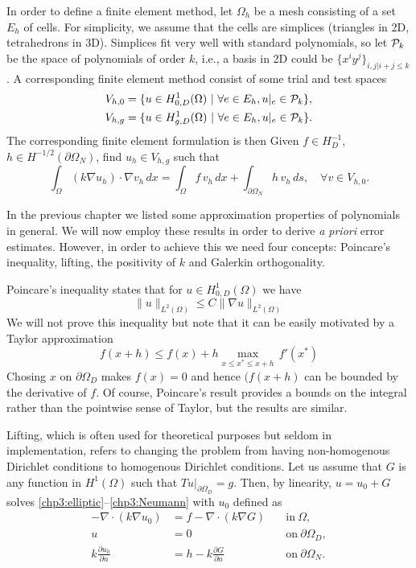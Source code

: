 In order to define a finite element method, let $\Omega_h$ be a mesh consisting of a set $E_h$ of cells. 
For simplicity, we assume that the cells are simplices (triangles in 2D, tetrahedrons in 3D). Simplices 
fit very well with standard polynomials, so let ${\cal P}_k$ be the space of 
polynomials of order $k$, i.e., a basis in 2D could be $\{x^i y^{j} \}_{i,j | i+j \le k}$.   
A corresponding finite element method consist of some trial and test spaces 
\begin{align}
V_{h, 0}  &= \{ u \in H^1_{0,D}(\Omega) \ | \  \forall e \in E_h, u|_e \in {\cal P}_k \}, \\   
V_{h, g}  &= \{ u \in H^1_{g,D}(\Omega) \ | \  \forall e \in E_h, u|_e \in {\cal P}_k \} .  
\end{align}
The corresponding finite element formulation is then 
Given $f\in H^{-1}_D$, $h\in H^{-1/2}(\partial \Omega_N)$,  
find $u_h\in  V_{h, g} $ such that  
\begin{equation}
\label{cp3:weak} 
\int_\Omega (k \nabla u_h ) \cdot \nabla v_h \, dx = \int_\Omega f \, v_h \, dx + \int_{\partial \Omega_N} h \, v_h \, ds, \quad    \forall v\in  V_{h, 0} .  
\end{equation} 

In the previous chapter we listed some approximation properties of polynomials in general. We will now employ these results in order to
derive \emph{a priori} error estimates. However, in order to achieve this we need four concepts: Poincare's inequality, lifting, the positivity of $k$
and Galerkin orthogonality. 

Poincare's inequality states that for $u\in  H^1_{0, D}(\Omega)$ we have
\begin{equation} 
\label{poincare}
\|u\|_{L^2(\Omega)}  \le C \| \nabla u\|_{L^2(\Omega)} 
\end{equation} 
We will not prove this inequality but note that it can be easily motivated by a Taylor approximation 
\[
f(x+h) \le f(x) + h \max_{x \le x^* \le x+h } \,  f'(x^*) 
\]
Chosing $x$ on $\partial \Omega_D$ makes $f(x)=0$ and hence $(f(x+h)$ can be bounded by the derivative
of $f$. Of course, Poincare's result provides a bounds on the integral rather than the pointwise sense 
of Taylor, but the results are similar. 

Lifting, which is often used for theoretical purposes but seldom in implementation, 
refers to changing the problem from having non-homogenous Dirichlet conditions to homogenous Dirichlet conditions.  
Let us assume that $G$ is any function in $H^1(\Omega)$ such that $T u |_{\partial \Omega_D} = g$. Then, by linearity, 
$u= u_0 + G$ solves \eqref{chp3:elliptic}--\eqref{chp3:Neumann} with $u_0$ defined as     
\begin{eqnarray}
\label{chp3:elliptic:lift}
-\nabla\cdot(k\nabla u_0 )  &= f -\nabla\cdot(k\nabla G)  &\quad \textrm{in}\ \Omega,\\
\label{chp3:Dirichlet:lift}
u&= 0 &\quad \textrm{on}\ \partial\Omega_D, \\
\label{chp3:Neumann:lift}
k \frac{\partial u_0}{\partial n}&= h - k \frac{\partial G}{\partial n} &\quad \textrm{on}\ \partial\Omega_N . 
\end{eqnarray}

